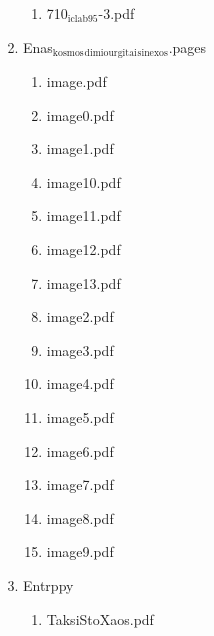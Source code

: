 \documentclass[11pt]{article}
\begin{document}
\begin{enumerate}
\begin{enumerate}
\begin{enumerate}
\begin{enumerate}
\begin{enumerate}
\begin{enumerate}
\item 710$_{\text{iclab95}}$-3.pdf
\label{sec-1-1-1-1-7-3-24-14-3}
\end{enumerate}

\item Enas$_{\text{kosmos}}$$_{\text{dimiourgitai}}$$_{\text{sinexos}}$.pages
\label{sec-1-1-1-1-7-3-24-15}
\begin{enumerate}
\item image.pdf
\label{sec-1-1-1-1-7-3-24-15-1}

\item image0.pdf
\label{sec-1-1-1-1-7-3-24-15-2}

\item image1.pdf
\label{sec-1-1-1-1-7-3-24-15-3}

\item image10.pdf
\label{sec-1-1-1-1-7-3-24-15-4}

\item image11.pdf
\label{sec-1-1-1-1-7-3-24-15-5}

\item image12.pdf
\label{sec-1-1-1-1-7-3-24-15-6}

\item image13.pdf
\label{sec-1-1-1-1-7-3-24-15-7}

\item image2.pdf
\label{sec-1-1-1-1-7-3-24-15-8}

\item image3.pdf
\label{sec-1-1-1-1-7-3-24-15-9}

\item image4.pdf
\label{sec-1-1-1-1-7-3-24-15-10}

\item image5.pdf
\label{sec-1-1-1-1-7-3-24-15-11}

\item image6.pdf
\label{sec-1-1-1-1-7-3-24-15-12}

\item image7.pdf
\label{sec-1-1-1-1-7-3-24-15-13}

\item image8.pdf
\label{sec-1-1-1-1-7-3-24-15-14}

\item image9.pdf
\label{sec-1-1-1-1-7-3-24-15-15}
\end{enumerate}

\item Entrppy
\label{sec-1-1-1-1-7-3-24-16}
\begin{enumerate}
\item TaksiStoXaos.pdf
\label{sec-1-1-1-1-7-3-24-16-1}
\end{enumerate}
\end{enumerate}


\end{enumerate}
\end{enumerate}
\end{enumerate}
\end{enumerate}
\end{document}
